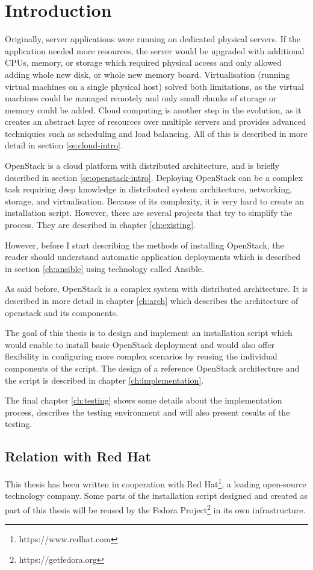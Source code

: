 \chapter{Introduction}

Originally, server applications were running on dedicated physical servers. If the application needed more resources, the server would be upgraded with additional CPUs, memory, or storage which  required physical access and only allowed adding whole new disk, or whole new memory board. Virtualisation (running virtual machines on a single physical host) solved both limitations, as the virtual machines could be managed remotely and only small chunks of storage or memory could be added. Cloud computing is another step in the evolution, as it creates an abstract layer of resources over multiple servers and provides advanced techniquies such as scheduling and load balancing. All of this is described in more detail in section \ref{se:cloud-intro}.

OpenStack is a cloud platform with distributed architecture, and is briefly described in section \ref{se:openstack-intro}. Deploying OpenStack can be a complex task requiring deep knowledge in distributed system architecture, networking, storage, and virtualisation. Because of its complexity, it is very hard to create an installation script. However, there are several projects that try to simplify the process. They are described in chapter \ref{ch:existing}.

However, before I start describing the methods of installing OpenStack, the reader should understand automatic application deployments which is described in section \ref{ch:ansible} using technology called Ansible.

As said before, OpenStack is a complex system with distributed architecture. It is described in more detail in chapter \ref{ch:arch} which describes the architecture of openstack and its components.

The goal of this thesis is to design and implement an installation script which would enable to install basic OpenStack deployment and would also offer flexibility in configuring more complex scenarios by reusing the individual components of the script. The design of a reference OpenStack architecture and the script is described in chapter \ref{ch:implementation}.

The final chapter \ref{ch:testing} shows some details about the implementation process, describes the testing environment and will also present results of the testing.

\section{Relation with Red Hat}

This thesis has been written in cooperation with Red Hat\footnote{https://www.redhat.com}, a leading open-source technology company. Some parts of the installation script designed and created as part of this thesis will be reused by the Fedora Project\footnote{https://getfedora.org} in its own infrastructure.
